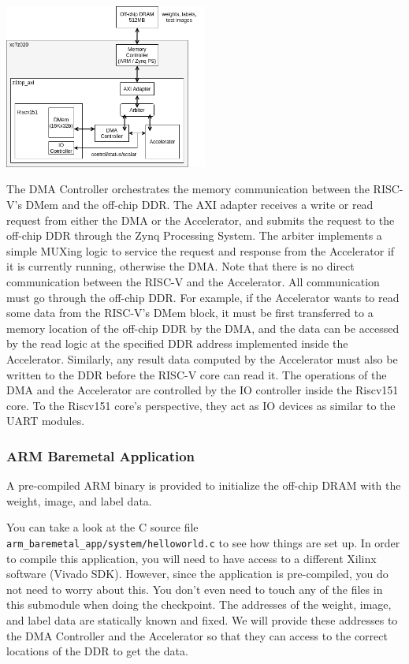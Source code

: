 \documentclass[11pt]{article}
\begin{document}
\begin{center}
\includegraphics[width=0.5\textwidth]{images/full_system.png}
\end{center}

The DMA Controller orchestrates the memory communication between the RISC-V's DMem and the off-chip DDR. The AXI adapter receives a write or read request from either the DMA or the Accelerator, and submits the request to the off-chip DDR through the Zynq Processing System. The arbiter implements a simple MUXing logic to service the request and response from the Accelerator if it is currently running, otherwise the DMA. Note that there is no direct communication between the RISC-V and the Accelerator. All communication must go through the off-chip DDR. For example, if the Accelerator wants to read some data from the RISC-V's DMem block, it must be first transferred to a memory location of the off-chip DDR by the DMA, and the data can be accessed by the read logic at the specified DDR address implemented inside the Accelerator. Similarly, any result data computed by the Accelerator must also be written to the DDR before the RISC-V core can read it. The operations of the DMA and the Accelerator are controlled by the IO controller inside the Riscv151 core. To the Riscv151 core's perspective, they act as IO devices as similar to the UART modules.

\subsubsection{ARM Baremetal Application}

A pre-compiled ARM binary is provided to initialize the off-chip DRAM with the weight, image, and label data.

You can take a look at the C source file \verb|arm_baremetal_app/system/helloworld.c| to see how things are set up. In order to compile this application, you will need to have access to a different Xilinx software (Vivado SDK). However, since the application is pre-compiled, you do not need to worry about this. You don't even need to touch any of the files in this submodule when doing the checkpoint. The addresses of the weight, image, and label data are statically known and fixed. We will provide these addresses to the DMA Controller and the Accelerator so that they can access to the correct locations of the DDR to get the data.
\end{document}
